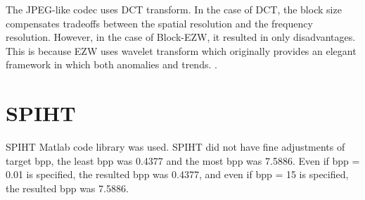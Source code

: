 \documentclass[article,oneside]{memoir}
\begin{document}
The JPEG-like codec uses DCT transform. 
In the case of DCT, the block size compensates tradeoffs between the spatial resolution and the frequency resolution. 
However, in the case of Block-EZW, it resulted in only disadvantages. 
This is because EZW uses wavelet transform which originally provides an elegant framework in which both anomalies and trends. \cite{Shapiro}. 

\section{SPIHT}

SPIHT Matlab code \cite{SPIHT} library was used. 
SPIHT did not have fine adjustments of target bpp, the least bpp was 0.4377 and the most bpp was 7.5886. Even if bpp = 0.01 is specified, the resulted bpp was 0.4377, and even if bpp = 15 is specified, the resulted bpp was 7.5886. 
\end{document}
